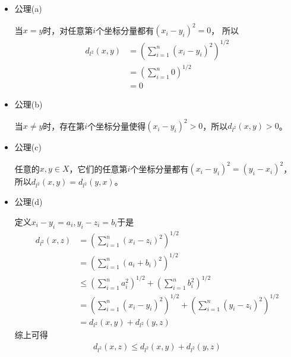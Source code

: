 \documentclass{article}
\begin{document}
\begin{itemize}
      \item 公理(a)

            当$x = y$时，对任意第$i$个坐标分量都有$(x_i - y_i)^2 = 0$， 所以
            \begin{align*}
                  d_{l^2}(x, y) & = \left(\sum\limits_{i=1}^n (x_i - y_i)^2\right)^{1/2} \\
                                & = \left(\sum\limits_{i=1}^n 0 \right)^{1/2}            \\
                                & = 0
            \end{align*}
      \item 公理(b)

            当$x \neq y$时，存在第$i$个坐标分量使得$(x_i - y_i)^2 > 0$，所以$d_{l^2}(x, y) > 0$。

      \item 公理(c)

            任意的$x, y \in X$，它们的任意第$i$个坐标分量都有$(x_i - y_i)^2 = (y_i - x_i)^2$，所以$d_{l^2}(x, y) = d_{l^2}(y, x)$。

      \item 公理(d)

            定义$x_i - y_i = a_i, y_i - z_i = b_i$于是
            \begin{align*}
                  d_{l^2}(x, z) & = \left(\sum\limits_{i=1}^n (x_i - z_i)^2\right)^{1/2}                                                        \\
                                & = \left(\sum\limits_{i=1}^n (a_i + b_i)^2\right)^{1/2}                                                        \\
                                & \leq \left(\sum\limits_{i=1}^n a_i^2\right)^{1/2} + \left(\sum\limits_{i=1}^n b_i^2\right)^{1/2}              \\
                                & = \left(\sum\limits_{i=1}^n (x_i - y_i)^2\right)^{1/2} + \left(\sum\limits_{i=1}^n (y_i - z_i)^2\right)^{1/2} \\
                                & = d_{l^2}(x, y) + d_{l^2}(y, z)
            \end{align*}
            综上可得
            \begin{align*}
                  d_{l^2}(x, z) \leq d_{l^2}(x, y) + d_{l^2}(y, z)
            \end{align*}

\end{itemize}
\end{document}
